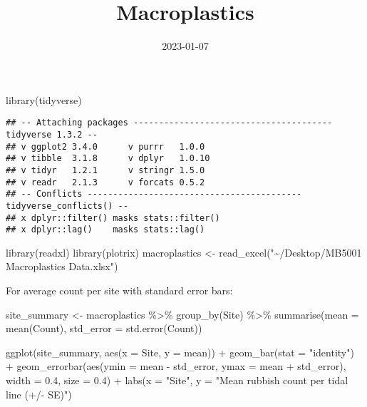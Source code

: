 \documentclass[
]{article}
\title{Macroplastics}
\author{}
\date{\vspace{-2.5em}2023-01-07}
\newenvironment{Shaded}{\begin{snugshade}}{\end{snugshade}}
\newcommand{\AttributeTok}[1]{\textcolor[rgb]{0.77,0.63,0.00}{#1}}
\newcommand{\FloatTok}[1]{\textcolor[rgb]{0.00,0.00,0.81}{#1}}
\newcommand{\FunctionTok}[1]{\textcolor[rgb]{0.00,0.00,0.00}{#1}}
\newcommand{\NormalTok}[1]{#1}
\newcommand{\OtherTok}[1]{\textcolor[rgb]{0.56,0.35,0.01}{#1}}
\newcommand{\SpecialCharTok}[1]{\textcolor[rgb]{0.00,0.00,0.00}{#1}}
\newcommand{\StringTok}[1]{\textcolor[rgb]{0.31,0.60,0.02}{#1}}
\begin{document}
\maketitle

\begin{Shaded}
\begin{Highlighting}[]
\FunctionTok{library}\NormalTok{(tidyverse)}
\end{Highlighting}
\end{Shaded}

\begin{verbatim}
## -- Attaching packages --------------------------------------- tidyverse 1.3.2 --
## v ggplot2 3.4.0      v purrr   1.0.0 
## v tibble  3.1.8      v dplyr   1.0.10
## v tidyr   1.2.1      v stringr 1.5.0 
## v readr   2.1.3      v forcats 0.5.2 
## -- Conflicts ------------------------------------------ tidyverse_conflicts() --
## x dplyr::filter() masks stats::filter()
## x dplyr::lag()    masks stats::lag()
\end{verbatim}

\begin{Shaded}
\begin{Highlighting}[]
\FunctionTok{library}\NormalTok{(readxl)}
\FunctionTok{library}\NormalTok{(plotrix)}
\NormalTok{macroplastics }\OtherTok{\textless{}{-}} \FunctionTok{read\_excel}\NormalTok{(}\StringTok{"\textasciitilde{}/Desktop/MB5001 Macroplastics Data.xlsx"}\NormalTok{)}
\end{Highlighting}
\end{Shaded}

For average count per site with standard error bars:

\begin{Shaded}
\begin{Highlighting}[]
\NormalTok{site\_summary }\OtherTok{\textless{}{-}}\NormalTok{ macroplastics }\SpecialCharTok{\%\textgreater{}\%} 
  \FunctionTok{group\_by}\NormalTok{(Site) }\SpecialCharTok{\%\textgreater{}\%} 
  \FunctionTok{summarise}\NormalTok{(}\AttributeTok{mean =} \FunctionTok{mean}\NormalTok{(Count), }\AttributeTok{std\_error =} \FunctionTok{std.error}\NormalTok{(Count))}

\FunctionTok{ggplot}\NormalTok{(site\_summary, }\FunctionTok{aes}\NormalTok{(}\AttributeTok{x =}\NormalTok{ Site, }\AttributeTok{y =}\NormalTok{ mean)) }\SpecialCharTok{+}
  \FunctionTok{geom\_bar}\NormalTok{(}\AttributeTok{stat =} \StringTok{"identity"}\NormalTok{) }\SpecialCharTok{+}
  \FunctionTok{geom\_errorbar}\NormalTok{(}\FunctionTok{aes}\NormalTok{(}\AttributeTok{ymin =}\NormalTok{ mean }\SpecialCharTok{{-}}\NormalTok{ std\_error, }\AttributeTok{ymax =}\NormalTok{ mean }\SpecialCharTok{+}\NormalTok{ std\_error), }\AttributeTok{width =} \FloatTok{0.4}\NormalTok{, }\AttributeTok{size =} \FloatTok{0.4}\NormalTok{) }\SpecialCharTok{+}
  \FunctionTok{labs}\NormalTok{(}\AttributeTok{x =} \StringTok{"Site"}\NormalTok{, }\AttributeTok{y =} \StringTok{"Mean rubbish count per tidal line (+/{-} SE)"}\NormalTok{)}
\end{Highlighting}
\end{Shaded}
\end{document}
